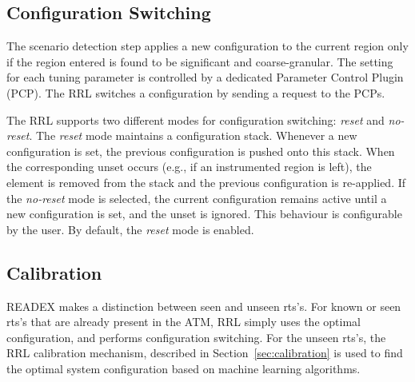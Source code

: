 \subsection{Configuration Switching}\label{config-switching}
The scenario detection step applies a new configuration to the current region only if the region entered is found to be significant and coarse-granular. The setting for each tuning parameter is controlled by a dedicated Parameter Control Plugin (PCP). The RRL switches a configuration by sending a request to the PCPs. 

The RRL supports two different modes for configuration switching: \textit{reset} and \textit{no-reset}. The \textit{reset} mode maintains a configuration stack. Whenever a new configuration is set, the previous configuration is pushed onto this stack. When the corresponding unset occurs (e.g., if an instrumented region is left), the element is removed from the stack and the previous configuration is re-applied. If the \textit{no-reset} mode is selected, the current configuration remains active until a new configuration is set, and the unset is ignored. This behaviour is configurable by the user. By default, the \textit{reset} mode is enabled.

\subsection{Calibration}\label{calibr}
READEX makes a distinction between seen and unseen rts's. For known or seen rts's that are already present in the ATM, RRL simply uses the optimal configuration, and performs configuration switching. For the unseen rts's, the RRL calibration mechanism, described in Section~\ref{sec:calibration} is used to find the optimal system configuration based on machine learning algorithms.

 

 